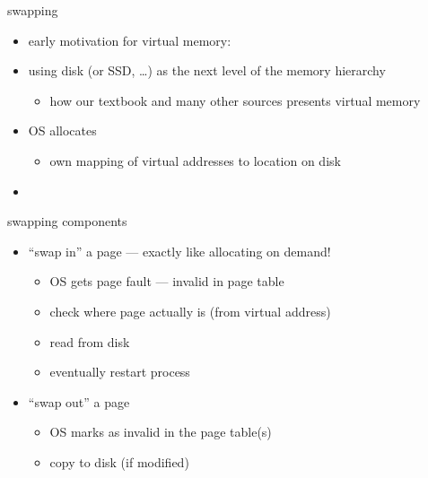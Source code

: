 \begin{frame}{swapping}
\begin{itemize}
    \item early motivation for virtual memory: 
\item using disk (or SSD, \ldots) as the next level of the memory hierarchy
\begin{itemize}
    \item how our textbook and many other sources presents virtual memory
\end{itemize}
\vspace{.5cm}
\item OS allocates 
    \begin{itemize}
    \item own mapping of virtual addresses to location on disk
    \end{itemize}
\item {}
\end{itemize}
\end{frame}

\begin{frame}{swapping components}
\begin{itemize}
\item ``swap in'' a page --- exactly like allocating on demand!
\begin{itemize}
    \item OS gets page fault --- invalid in page table
    \item check where page actually is (from virtual address)
    \item read from disk
    \item eventually restart process
\end{itemize}
\item ``swap out'' a page
\begin{itemize}
    \item OS marks as invalid in the page table(s)
    \item copy to disk (if modified)
\end{itemize}
\end{itemize}
\end{frame}


